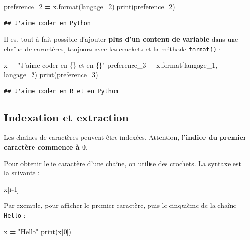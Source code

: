 \documentclass[12pt,]{book}
\newenvironment{Shaded}{\begin{snugshade}}{\end{snugshade}}
\newcommand{\DecValTok}[1]{\textcolor[rgb]{0.00,0.00,0.81}{#1}}
\newcommand{\SpecialCharTok}[1]{\textcolor[rgb]{0.00,0.00,0.00}{#1}}
\newcommand{\StringTok}[1]{\textcolor[rgb]{0.31,0.60,0.02}{#1}}
\newcommand{\OperatorTok}[1]{\textcolor[rgb]{0.81,0.36,0.00}{\textbf{#1}}}
\newcommand{\BuiltInTok}[1]{#1}
\newcommand{\NormalTok}[1]{#1}
\numberwithin{equation}{section}
\numberwithin{countremarque}{section}
\begin{document}
\begin{Shaded}
\begin{Highlighting}[]
\NormalTok{preference_2 }\OperatorTok{=}\NormalTok{ x.}\BuiltInTok{format}\NormalTok{(langage_2)}
\BuiltInTok{print}\NormalTok{(preference_2)}
\end{Highlighting}
\end{Shaded}

\begin{lstlisting}
## J'aime coder en Python
\end{lstlisting}

Il est tout à fait possible d'ajouter \textbf{plus d'un contenu de
variable} dans une chaîne de caractères, toujours avec les crochets et
la méthode \texttt{format()} :

\begin{Shaded}
\begin{Highlighting}[]
\NormalTok{x }\OperatorTok{=} \StringTok{"J'aime coder en }\SpecialCharTok{\{\}}\StringTok{ et en }\SpecialCharTok{\{\}}\StringTok{"}
\NormalTok{preference_3 }\OperatorTok{=}\NormalTok{ x.}\BuiltInTok{format}\NormalTok{(langage_1, langage_2)}
\BuiltInTok{print}\NormalTok{(preference_3)}
\end{Highlighting}
\end{Shaded}

\begin{lstlisting}
## J'aime coder en R et en Python
\end{lstlisting}

\subsection{Indexation et extraction}\label{indexation-et-extraction}

Les chaînes de caractères peuvent être indexées. Attention,
\textbf{l'indice du premier caractère commence à 0}.

Pour obtenir le ie caractère d'une chaîne, on utilise des crochets. La
syntaxe est la suivante :

\begin{Shaded}
\begin{Highlighting}[]
\NormalTok{x[i}\OperatorTok{-}\DecValTok{1}\NormalTok{]}
\end{Highlighting}
\end{Shaded}

Par exemple, pour afficher le premier caractère, puis le cinquième de la
chaîne \texttt{Hello} :

\begin{Shaded}
\begin{Highlighting}[]
\NormalTok{x }\OperatorTok{=} \StringTok{"Hello"}
\BuiltInTok{print}\NormalTok{(x[}\DecValTok{0}\NormalTok{])}
\end{Highlighting}
\end{Shaded}
\end{document}
